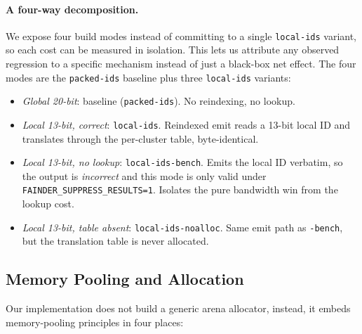 \paragraph{A four-way decomposition.} We expose four build modes instead of committing to a single \texttt{local-ids} variant, so each cost can be measured in isolation. This lets us attribute any observed regression to a specific mechanism instead of just a black-box net effect. The four modes are the \texttt{packed-ids} baseline plus three \texttt{local-ids} variants:


\begin{itemize}
    \item[--] \emph{Global 20-bit}: baseline (\texttt{packed-ids}). No reindexing, no lookup.
    \item[--] \emph{Local 13-bit, correct}: \texttt{local-ids}. Reindexed emit reads a 13-bit local ID and translates through the per-cluster table, byte-identical.
    \item[--] \emph{Local 13-bit, no lookup}: \texttt{local-ids-bench}. Emits the local ID verbatim, so the output is \emph{incorrect} and this mode is only valid under \texttt{FAINDER\_SUPPRESS\_RESULTS=1}. Isolates the pure bandwidth win from the lookup cost.
    \item[--] \emph{Local 13-bit, table absent}: \texttt{local-ids-noalloc}. Same emit path as \texttt{-bench}, but the translation table is never allocated.
\end{itemize}

\subsection{Memory Pooling and Allocation\label{sec:method:impl:pooling}}

Our implementation does not build a generic arena allocator, instead, it embeds memory-pooling principles in four places:

